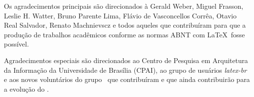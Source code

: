 %
%
%
%

Os agradecimentos principais são direcionados à Gerald Weber, Miguel Frasson,
Leslie H. Watter, Bruno Parente Lima, Flávio de Vasconcellos Corrêa, Otavio Real
Salvador, Renato Machnievscz e todos aqueles que
contribuíram para que a produção de trabalhos acadêmicos conforme
as normas ABNT com \LaTeX\ fosse possível.

Agradecimentos especiais são direcionados ao Centro de Pesquisa em Arquitetura
da Informação da Universidade de
Brasília (CPAI), ao grupo de usuários
\emph{latex-br} e aos
novos voluntários do grupo
\emph{\abnTeX}~que contribuíram e que ainda
contribuirão para a evolução do \abnTeX.